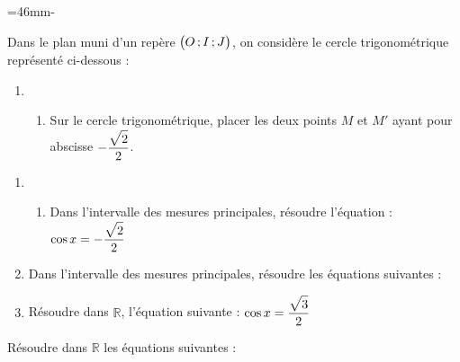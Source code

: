 \documentclass{book}
\begin{document}
\begin{multicols*}{2}
\leavevmode\exercice


=46mm\hsize\advance{}-
\begin{minipage}[t]{\dimen1}
Dans le plan muni d'un rep\`ere $\Se\big(O\,;\,I\,;\,J\big)$, on consid\`ere le cercle trigonom\'etrique repr\'esent\'e ci-dessous :

\vskip0.2cm
\begin{enumerate}
\item \begin{enumerate}
\item Sur le cercle trigonom\'etrique, placer les deux points $M$ et $M'$ ayant pour abscisse $-\dfrac{\sqrt{2\mathstrut}}2$.
\end{enumerate}
\end{enumerate}
\end{minipage}
\begin{minipage}[t]{\dimen0}
\leavevmode\hfill{}\hbox{}
\end{minipage}

\begin{enumerate}
\item[] \begin{enumerate}
\setcounter{enumii}1

\setcounter{enumi}1
\item Dans l'intervalle des mesures principales, r\'esoudre l'\'equation :\newline
\hglue\leftmarginii$\cos x=-\dfrac{\sqrt{2\mathstrut}}2$
\end{enumerate}

\item Dans l'intervalle des mesures principales, r\'esoudre les \'equations suivantes :


\item R\'esoudre dans $\mathbb{R}$, l'\'equation suivante :\newline
\hglue\leftmarginii$\cos x=\dfrac{\sqrt{3\mathstrut}}2$
\end{enumerate}

\leavevmode\exercice


R\'esoudre dans $\mathbb{R}$ les \'equations suivantes :



\leavevmode\exercice



\end{multicols*}
\end{document}
